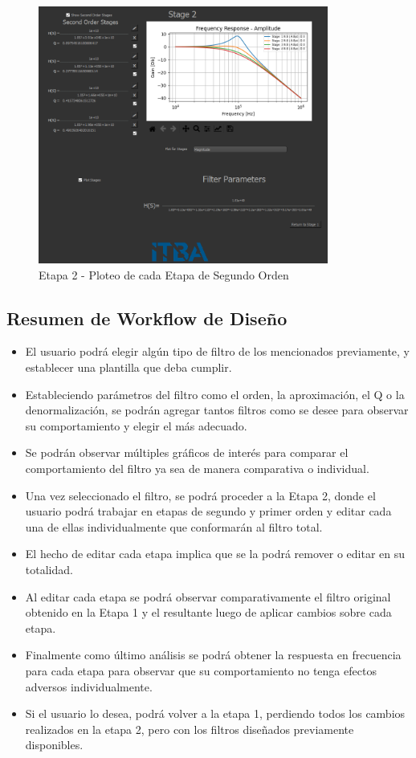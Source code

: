 \begin{figure}[H]
    \centering
    \includegraphics[width=0.85\textwidth]{../Ejercicio1-FilterTool/Imagenes/stage-plot.png}
    \caption{Etapa 2 - Ploteo de cada Etapa de Segundo Orden}
\end{figure}

\subsection{Resumen de Workflow de Diseño}

\begin{itemize}
	\item El usuario podrá elegir algún tipo de filtro de los mencionados previamente, y establecer una plantilla que deba cumplir.
	\item Estableciendo parámetros del filtro como el orden, la aproximación, el Q o la denormalización, se podrán agregar tantos filtros como se desee para observar su comportamiento y elegir el más adecuado.
	\item Se podrán observar múltiples gráficos de interés para comparar el comportamiento del filtro ya sea de manera comparativa o individual.
	\item Una vez seleccionado el filtro, se podrá proceder a la Etapa 2, donde el usuario podrá trabajar en etapas de segundo y primer orden y editar cada una de ellas individualmente que conformarán al filtro total.
	\item El hecho de editar cada etapa implica que se la podrá remover o editar en su totalidad.
	\item Al editar cada etapa se podrá observar comparativamente el filtro original obtenido en la Etapa 1 y el resultante luego de aplicar cambios sobre cada etapa.
	\item Finalmente como último análisis se podrá obtener la respuesta en frecuencia para cada etapa para observar que su comportamiento no tenga efectos adversos individualmente.
	\item Si el usuario lo desea, podrá volver a la etapa 1, perdiendo todos los cambios realizados en la etapa 2, pero con los filtros diseñados previamente disponibles. 
\end{itemize}

